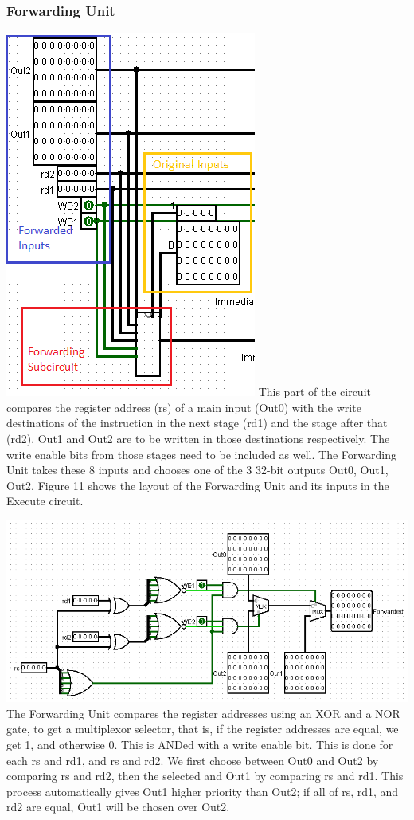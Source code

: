 \documentclass{article}
\begin{document}
\subsubsection{Forwarding Unit}
\includegraphics{Forward1.png}
This part of the circuit compares the register address (rs) of a main input (Out0) with the write destinations of the instruction in the next stage (rd1) and the stage after that (rd2). Out1 and Out2 are to be written in those destinations respectively. The write enable bits from those stages need to be included as well. The Forwarding Unit takes these 8 inputs and chooses one of the 3 32-bit outputs Out0, Out1, Out2. Figure 11 shows the layout of the Forwarding Unit and its inputs in the Execute circuit.

\includegraphics{Forward2.png}
The Forwarding Unit compares the register addresses using an XOR and a NOR gate, to get a multiplexor selector, that is, if the register addresses are equal, we get 1, and otherwise 0. This is ANDed with a write enable bit. This is done for each rs and rd1, and rs and rd2. We first choose between Out0 and Out2 by comparing rs and rd2, then the selected and Out1 by comparing rs and rd1. This process automatically gives Out1 higher priority than Out2; if all of rs, rd1, and rd2 are equal, Out1 will be chosen over Out2. 
\end{document}
